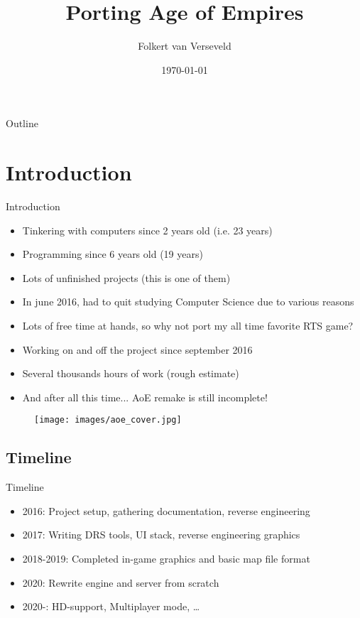 \documentclass{beamer}
\title[Preserving and opensourcing RTS video games]{Porting Age of Empires}
\author{Folkert van Verseveld}
\institute{University of Amsterdam}
\date{\today}
\begin{document}

\begin{frame}
  \titlepage
\end{frame}

\begin{frame}{Outline}
	\tableofcontents
\end{frame}


\section{Introduction}

\begin{frame}{Introduction}
	\begin{itemize}
		\item Tinkering with computers since 2 years old (i.e. 23 years)
		\item Programming since 6 years old (19 years)
		\item Lots of unfinished projects (this is one of them)
		\item In june 2016, had to quit studying Computer Science due to various reasons
		\item Lots of free time at hands, so why not port my all time favorite RTS game?
		\item Working on and off the project since september 2016
		\item Several thousands hours of work (rough estimate)
		\item And after all this time... AoE remake is still incomplete!
	\end{itemize}
\end{frame}


\begin{frame}
	\begin{figure}
	\texttt{[image: images/aoe\_cover.jpg]}
	\end{figure}

\end{frame}


\subsection{Timeline}

\begin{frame}{Timeline}
	\begin{itemize}
		\item 2016: Project setup, gathering documentation, reverse engineering
		\item 2017: Writing DRS tools, UI stack, reverse engineering graphics
		\item 2018-2019: Completed in-game graphics and basic map file format
		\item 2020: Rewrite engine and server from scratch
		\item 2020-: HD-support, Multiplayer mode, \dots
	\end{itemize}
\end{frame}
\end{document}

